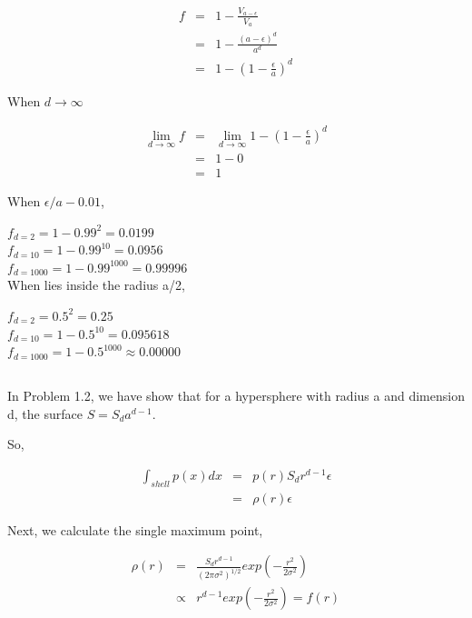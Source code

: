 \documentclass{article} %
\begin{document}
\begin{equation}
    \begin{array}{rcl}
     	f & = & 1 - \frac{V_{a-\epsilon}}{V_a}  \\
	& = &  1 - \frac{{(a-\epsilon)}^{d}}{a^d}\\
	& = & 1 - (1-\frac{\epsilon}{a})^d
    \end{array}
\end{equation}

When $d \to \infty$

\begin{equation}
    \begin{array}{rcl}
     	\lim\limits_{d \to \infty}^{} f & = & \lim\limits_{d \to \infty}^{}  1 - (1-\frac{\epsilon}{a})^d \\
	& = & 1 - 0 \\
	& = & 1
    \end{array}
\end{equation}

When $\epsilon / a - 0.01$,

$f_{d=2} = 1 - 0.99^2 = 0.0199$ \\
$f_{d=10} = 1 - 0.99^10 = 0.0956$ \\
$f_{d=1000} = 1 - 0.99^1000 = 0.99996$ \\

When lies inside the radius a/2,

$f_{d=2} = 0.5^2 = 0.25$ \\
$f_{d=10} = 1 - 0.5^10 = 0.095618$ \\
$f_{d=1000} = 1 - 0.5^1000 \approx 0.00000$ \\


\subsection{}
In Problem 1.2, we have show that for a hypersphere with radius a and dimension d, the surface $S = S_d a ^{d-1}$. 

So, 

\begin{equation}
    \begin{array}{rcl}
      	\int_{shell}^{} p(x) dx & = & p(r) S_d r^{d-1} \epsilon \\
	& = & \rho (r) \epsilon
    \end{array}
\end{equation}

Next, we calculate the  single maximum point,

\begin{equation}
    \begin{array}{rcl}
      	\rho (r) & = & \frac{S_d r^{d-1}}{(2\pi \sigma ^ 2) ^ {1/2}} exp ( - \frac{r^2}{2 \sigma ^2} ) \\
	& \propto & r^{d-1} exp ( - \frac{r^2}{2 \sigma ^2} )  =  f(r)\\
    \end{array}
\end{equation}
\end{document}
